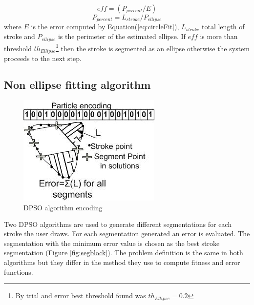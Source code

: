 \documentclass[10pt]{article}
\begin{document}
 \begin{equation}
eff= (P_{percent}/E)
\label{eq:circleError}
\end{equation}
 \begin{equation}
P_{percent}  = L_{stroke} /P_{ellipse} 
\label{eq:ErrorArea}
\end{equation}
where $E$ is the error computed by Equation(\ref{eq:circleFit}), $L_{stroke}$ total length of stroke and $P_{ellipse} $ is the perimeter of the estimated ellipse. If $eff$ is more than threshold $th_{Ellipse}$\footnote{By trial and error best threshold found was $th_{Ellipse}=0.2$} then the stroke is segmented as an ellipse otherwise the system proceeds to the next step. 

\subsection{Non ellipse fitting algorithm}
\label{subsubsec:Discreteparticleswarmalgorithm}
\begin{figure}
	\centering
	 \includegraphics[scale=0.7]{pso1.jpg}			
	\caption{DPSO algorithm encoding}%
	\label{fig:pso1}
\end{figure}
Two DPSO algorithms are used to generate different segmentations for each stroke the user draws. For each segmentation generated an error is evaluated. The segmentation with the minimum error value is chosen as the best stroke segmentation (Figure \ref{fig:segblock}). The problem definition is the same in both algorithms but they differ in the method they use to compute fitness and error functions. 
\end{document}
